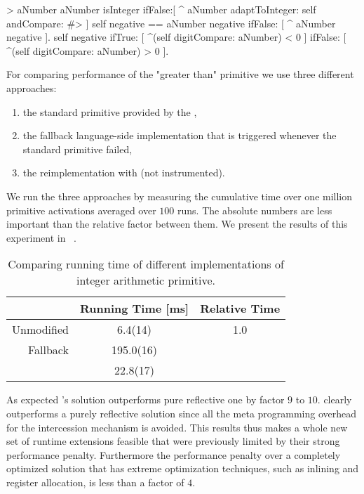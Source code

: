 \begin{stcode}{1}
> aNumber
	aNumber isInteger 
		ifFalse:[
			^ aNumber 
				adaptToInteger: self andCompare: #> ]
	self negative == aNumber negative
		ifFalse: [ ^ aNumber negative ].
	self negative
		ifTrue: [ ^(self digitCompare: aNumber) < 0 ]
		ifFalse: [ ^(self digitCompare: aNumber) > 0 ].
\end{stcode}


\noindent For comparing performance of the "greater than" primitive we use three different approaches:
\begin{enumerate}
	\item the standard primitive provided by the \VM,
	\item the fallback language-side implementation that is triggered whenever the standard primitive failed,
	\item the reimplementation with \WF (not instrumented).
\end{enumerate}
%
We run the three approaches by measuring the cumulative time over one million primitive activations averaged over $100$ runs.
The absolute numbers are less important than the relative factor between them.
We present the results of this experiment in ~.
%
\begin{table}[H]
    \centering
    \begin{tabular}{rSS}
					& {Running Time [ms]} & {Relative Time} \\\midrule
		Unmodified	&   6.4(14)           & 1.0\\
		Fallback	& 195.0(16)           &  \\
		\WF	        &  22.8(17)           & 
    \end{tabular}
    \caption[\WF Speed Comparison: Large Integer]{Comparing running time of different implementations of integer arithmetic primitive.}
\end{table}

\noindent As expected \WF's solution outperforms pure reflective one by factor $9$ to $10$.
\WF clearly outperforms a purely reflective solution since all the meta programming overhead for the intercession mechanism is avoided.
This results thus makes a whole new set of runtime extensions feasible that were previously limited by their strong performance penalty.
Furthermore the performance penalty over a completely optimized \VM solution that has extreme optimization techniques, such as inlining and register allocation, is less than a factor of $4$.

